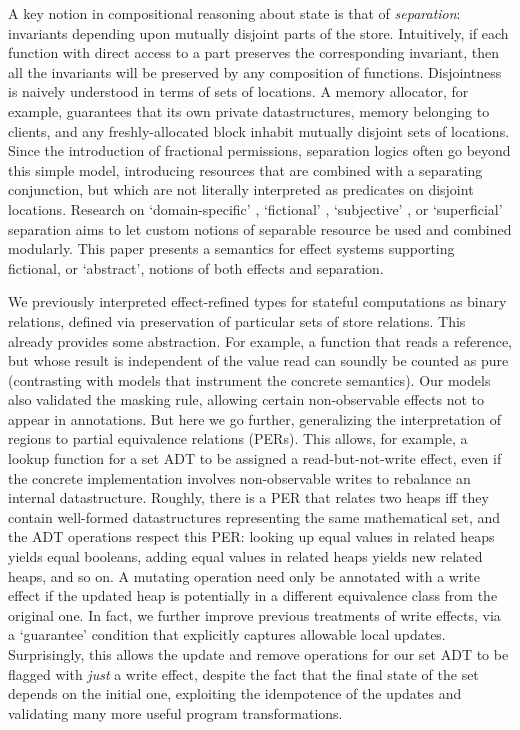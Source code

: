 \documentclass[orivec]{llncs}
\newcommand{\squelch}[1]{}
\begin{document}
A key notion in compositional reasoning about state is that of
\emph{separation}: invariants depending upon mutually disjoint parts
of the store. Intuitively, if each function with direct access to a
part preserves the corresponding invariant, then all the invariants
will be preserved by any composition of functions. Disjointness is
naively understood in terms of sets of locations.  A memory
allocator, for example, guarantees that its own private
datastructures, memory belonging to clients, and any
freshly-allocated block inhabit mutually disjoint sets of
locations. Since the introduction of fractional permissions,
separation logics often go beyond this simple model, introducing
resources that are combined with a separating conjunction, but which
are not literally interpreted as predicates on disjoint
locations. Research on `domain-specific'
\cite{DBLP:conf/tldi/KrishnaswamiBA10}, `fictional'
\cite{DBLP:conf/vstte/Dinsdale-YoungGW10,DBLP:conf/esop/JensenB12},
`subjective' \cite{leywild:scsl}, or `superficial'
\cite{krishnaswami:superficially} separation \squelch{logics and type theories}
aims to let custom notions of separable resource be used
and combined modularly. This paper presents a semantics for effect
systems supporting fictional, or `abstract', notions of both effects
and separation.

We previously interpreted effect-refined types for stateful
computations as binary relations, defined via preservation of
particular sets of store relations. This already provides some
abstraction. For example, a function that reads a reference, but whose
result is independent of the value read can soundly be counted as pure
(contrasting with models that instrument the concrete semantics). Our
models also validated the masking rule, allowing certain
non-observable effects not to appear in annotations. But here we go
further, generalizing the interpretation of regions to partial
equivalence relations (PERs). This allows, for example, a lookup
function for a set ADT to be assigned a read-but-not-write effect,
even if the concrete implementation involves non-observable writes to
rebalance an internal datastructure. Roughly, there is a PER that
relates two heaps iff they contain well-formed datastructures
representing the same mathematical set, and the ADT operations respect
this PER: looking up equal values in related heaps yields equal
booleans, adding equal values in related heaps yields new related
heaps, and so on. A mutating operation need only be annotated with a
write effect if the updated heap is potentially in a different
equivalence class from the original one. In fact, we further improve
previous treatments of write effects, via a `guarantee' condition that
explicitly captures allowable local updates. Surprisingly, this allows
the update and remove operations for our set ADT to be flagged with
\emph{just} a write effect, despite the fact that the final state of
the set depends on the initial one, exploiting the idempotence of the
updates and validating many more useful program transformations.
\end{document}
